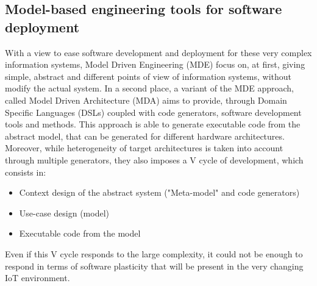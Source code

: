 







\subsection{Model-based engineering tools for software deployment}
With a view to ease software development and deployment for these very complex information systems, Model Driven Engineering (MDE) focus on, at first, giving simple, abstract and different points of view of information systems, without modify the actual system. 
In a second place, a variant of the MDE approach, called Model Driven Architecture (MDA)\cite{kleppe2003mda} aims to provide, through Domain Specific Languages (DSLs) coupled with code generators, software development tools and methods.
This approach is able to generate executable code from the abstract model, that can be generated for different hardware architectures.
Moreover, while heterogeneity of target architectures is taken into account through multiple generators, they also imposes a V cycle of development\cite{fouquet2013kevoree}, which consists in:
\begin{itemize}
	\item Context design of the abstract system ("Meta-model" and code generators)
	\item Use-case design (model)
	\item Executable code from the model
\end{itemize}
Even if this V cycle responds to the large complexity, it could not be enough to respond in terms of software plasticity that will be present in the very changing IoT environment.

